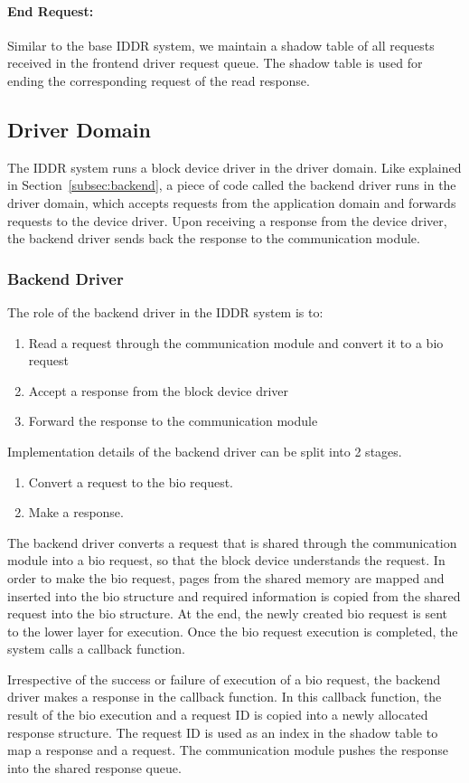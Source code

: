 \paragraph{End Request:}
Similar to the base IDDR system, we maintain a shadow table of all requests received in the frontend driver request queue. The shadow table is used for ending the corresponding request of the read response. 

\subsection{Driver Domain}
The IDDR system runs a block device driver in the driver domain. Like explained in Section~\ref{subsec:backend}, a piece of code called the backend driver runs in the driver domain, which accepts requests from the application domain and forwards requests to the device driver. Upon receiving a response from the device driver, the backend driver sends back the response to the communication module.

\subsubsection*{Backend Driver}
The role of the backend driver in the IDDR system is to:
\begin{enumerate}
\item Read a request through the communication module and convert it to a bio request
\item Accept a response from the block device driver
\item Forward the response to the communication module
\end{enumerate}

Implementation details of the backend driver can be split into 2 stages. 
\begin{enumerate}
\item Convert a request to the bio request. 
\item Make a response.
\end{enumerate}

\label{subsec:createbio}
The backend driver converts a request that is shared through the communication module into a bio request, so that the block device understands the request. In order to make the bio request, pages from the shared memory are mapped and inserted into the bio structure and required information is copied from the shared request into the bio structure. At the end, the newly created bio request is sent to the lower layer for execution. Once the bio request execution is completed, the system calls a callback function.

Irrespective of the success or failure of execution of a bio request, the backend driver makes a response in the callback function. In this callback function, the result of the bio execution and a request ID is copied into a newly allocated response structure. The request ID is used as an index in the shadow table to map a response and a request. The communication module pushes the response into the shared response queue.

% 
